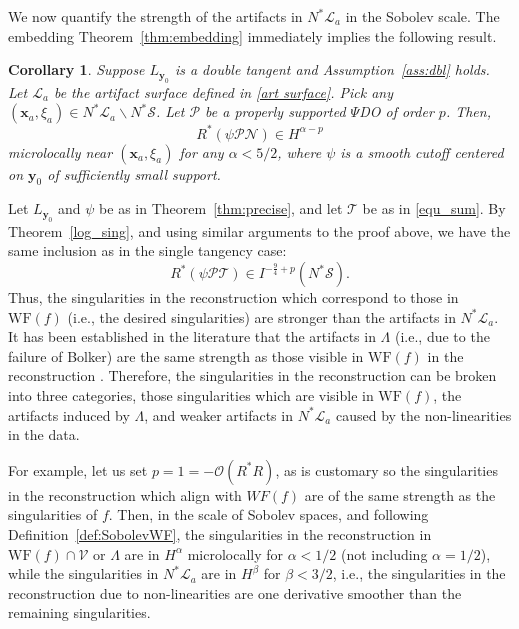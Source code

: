 \documentclass[11pt]{article}
\newcommand{\jc}[1]{\begin{quotation}\textbf{James' comment:\
}{\textit{#1}}\end{quotation}}
\newcommand{\be}{\begin{equation}}
\newcommand{\ee}{\end{equation}}
\newcommand{\s}{\mathcal S}
\newcommand{\WF}{\mathrm{WF}}
\newcommand{\CL}{\mathcal L}
\newcommand{\CP}{\mathcal P}
\numberwithin{equation}{section}
\newcommand{\vy}{\mathbf{y}}
\newcommand{\vx}{\mathbf{x}}
\newtheorem{corollary}[theorem]{Corollary}
\theoremstyle{definition}
\begin{document}
We now quantify the strength of the artifacts in $N^*\CL_a$ in the Sobolev scale. The embedding Theorem~\ref{thm:embedding} immediately implies the following result.
\begin{corollary}\label{corr_sob}
Suppose $L_{\vy_0}$ is a double tangent and Assumption~\ref{ass:dbl} holds. Let $\CL_a$ be the artifact surface defined in \eqref{art surface}. Pick any $(\vx_a,\xi_a) \in N^*\CL_a\backslash N^*\s$. Let $\CP$ be a properly supported $\Psi$DO of order $p$. Then,
\be
R^* (\psi\CP \mathcal{N}) \in H^{\alpha - p}
\ee
microlocally near $(\vx_a,\xi_a)$ for any $\alpha < 5/2$, where $\psi$ is a smooth cutoff centered on $\vy_0$ of sufficiently small support.
\end{corollary}

Let $L_{\vy_0}$ and $\psi$ be as in Theorem~\ref{thm:precise}, and let $\mathcal{T}$ be as in \eqref{equ_sum}. By Theorem~\ref{log_sing}, and using similar arguments to the proof above, we have the same inclusion as in the single tangency case:
\be
R^* (\psi \CP \mathcal{T}) \in I^{-\frac{9}{4} + p}(N^*\s).
\ee
Thus, the singularities in the reconstruction which correspond to those in $\WF(f)$ (i.e., the desired singularities) are stronger than the artifacts in $N^*\CL_a$. It has been established in the literature that the artifacts in $\Lambda$ (i.e., due to the failure of Bolker) are the same strength as those visible in $\WF(f)$ in the reconstruction \cite[section 8]{flu}. Therefore, the singularities in the reconstruction can be broken into three categories, those singularities which are visible in $\WF(f)$, the artifacts induced by $\Lambda$, and weaker artifacts in $N^*\CL_a$ caused by the non-linearities in the data.

For example, let us set $p = 1 = -\mathcal{O}(R^*R)$, as is customary so the singularities in the reconstruction which align with $WF(f)$ are of the same strength as the singularities of $f$. Then, in the scale of Sobolev spaces, and following Definition~\ref{def:SobolevWF}, the singularities in the reconstruction in $\WF(f)\cap \mathcal{V}$ or $\Lambda$ are in $H^{\alpha}$ microlocally for $\alpha < 1/2$ (not including $\alpha = 1/2$), while the singularities in $N^*\CL_a$ are in $H^{\beta}$ for $\beta < 3/2$, i.e., the singularities in the reconstruction due to non-linearities are one derivative smoother than the remaining singularities. 
\end{document}
